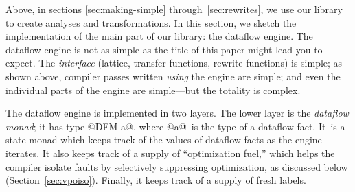 \documentclass[blockstyle,preprint,natbib,nocopyrightspace]{sigplanconf}
\def\authornote#1{\unskip\relax}
\newcommand{\norman}[1]{\authornote{NR: #1}}
\let\remark\norman
\newcommand\secref[1]{Section~\ref{sec:#1}}
\begin{document}
Above, in sections \ref{sec:making-simple}
through~\ref{sec:rewrites},
we use our library to create analyses and transformations.
In this section, we sketch the implementation of the main part of our
library: the dataflow engine.
The dataflow engine is not as simple as the title of this paper might
lead you to expect.
The \emph{interface} (lattice, transfer functions, rewrite functions) is simple;
as shown above, compiler passes written \emph{using} the engine
are simple;
and even the individual parts of the engine are simple---but the
totality is complex.

\remark{Simon asked what new insights are gained.
Compared with our earlier work, using CPS dramatically simplifies the
dataflow engine.}

The dataflow engine is implemented in two layers.
The lower layer is the \emph{dataflow monad};
it has type @DFM a@, where @a@~is the type of a
dataflow fact.
It~is a state monad which keeps track of the values of dataflow facts
as the engine iterates.
It also keeps track of a supply of ``optimization fuel,'' which
helps the compiler isolate faults by selectively suppressing
optimization, as discussed
below (\secref{vpoiso}). 
Finally, it keeps track of a supply of fresh labels.
\end{document}
